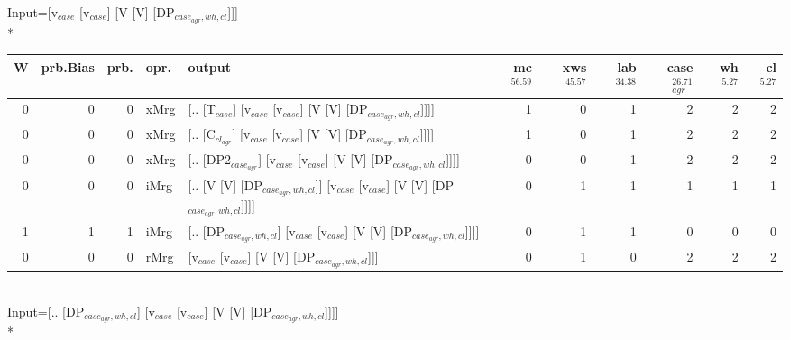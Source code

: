 \begingroup\scriptsize Input=[v$_{case}$ [v$_{case}$] [V [V] [DP$_{case_{agr},wh,cl}$]]]\\*
\begin{tabularx}{\linewidth}{rrrlXrrrrrr}
\hline
   W &   prb.Bias &   prb. & opr.   & output                                                                         &   mc$^{56.59}$ &   xws$^{45.57}$ &   lab$^{34.38}$ &   case$_{agr}^{26.71}$ &   wh$^{5.27}$ &   cl$^{5.27}$ \\
\hline
   0 &       0 &   0 & xMrg & [.. [T$_{case}$] [v$_{case}$ [v$_{case}$] [V [V] [DP$_{case_{agr},wh,cl}$]]]]                    &            1 &             0 &             1 &                  2 &           2 &           2 \\
   0 &       0 &   0 & xMrg & [.. [C$_{cl_{agr}}$] [v$_{case}$ [v$_{case}$] [V [V] [DP$_{case_{agr},wh,cl}$]]]]                  &            1 &             0 &             1 &                  2 &           2 &           2 \\
   0 &       0 &   0 & xMrg & [.. [DP2$_{case_{agr}}$] [v$_{case}$ [v$_{case}$] [V [V] [DP$_{case_{agr},wh,cl}$]]]]              &            0 &             0 &             1 &                  2 &           2 &           2 \\
   0 &       0 &   0 & iMrg & [.. [V [V] [DP$_{case_{agr},wh,cl}$]] [v$_{case}$ [v$_{case}$] [V [V] [DP$_{case_{agr},wh,cl}$]]]] &            0 &             1 &             1 &                  1 &           1 &           1 \\
   1 &       1 &   1 & iMrg & [.. [DP$_{case_{agr},wh,cl}$] [v$_{case}$ [v$_{case}$] [V [V] [DP$_{case_{agr},wh,cl}$]]]]         &            0 &             1 &             1 &                  0 &           0 &           0 \\
   0 &       0 &   0 & rMrg & [v$_{case}$ [v$_{case}$] [V [V] [DP$_{case_{agr},wh,cl}$]]]                                  &            0 &             1 &             0 &                  2 &           2 &           2 \\
\hline
\end{tabularx}\endgroup\\
\begingroup\scriptsize Input=[.. [DP$_{case_{agr},wh,cl}$] [v$_{case}$ [v$_{case}$] [V [V] [DP$_{case_{agr},wh,cl}$]]]]\\*

